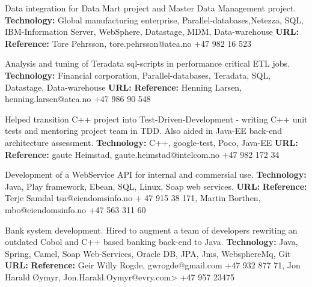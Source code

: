 \documentclass[11pt,a4paper,sans]{moderncv} %
\begin{document}
{
Data integration for Data Mart project and Master Data Management project.
\newline{}\textbf{Technology:}
Global manufacturing enterprise, Parallel-databases,Netezza, SQL, IBM-Information Server, WebSphere, Datastage, MDM, Data-warehouse
\newline{}\textbf{URL:} 
\newline{}\textbf{Reference:} Tore Pehrsson, tore.pehrsson@atea.no +47 982 16 523
}

{
Analysis and tuning of Teradata sql-scripts in performance critical ETL jobs.
\newline{}\textbf{Technology:} Financial corporation, Parallel-databases, Teradata, SQL, Datastage, Data-warehouse
\newline{}\textbf{URL:} 
\newline{}\textbf{Reference:} Henning Larsen, henning.larsen@atea.no +47 986 90 548
}

{
Helped transition C++ project into Test-Driven-Development
- writing C++ unit tests and mentoring project team in TDD. Also aided in Java-EE back-end architecture assessment.
\newline{}\textbf{Technology:} C++, google-test, Poco, Java-EE
\newline{}\textbf{URL:} 
\newline{}\textbf{Reference:} gaute Heimstad, gaute.heimstad@intelcom.no  +47 982 172 34
}

{
Development of a WebService API for internal and commersial use.
\newline{}\textbf{Technology:} Java, Play framework, Ebean, SQL, Linux, Soap web services.
\newline{}\textbf{URL:} 
\newline{}\textbf{Reference:} Terje Samdal tsa@eiendomsinfo.no + 47 915 38 171, Martin Borthen, mbo@eiendomsinfo.no +47 563 311 60
}

{
Bank system development. Hired to augment a team of developers rewriting an outdated Cobol and C++ based banking back-end to Java.
\newline{}\textbf{Technology:} Java, Spring, Camel, Soap Web-Services, Oracle DB, JPA, Jms, WebsphereMq, Git
\newline{}\textbf{URL:} 
\newline{}\textbf{Reference:} Geir Willy Rogde, gwrogde@gmail.com +47 932 877 71, Jon Harald Øymyr, Jon.Harald.Oymyr@evry.com> +47 957 23475
}
\end{document}

